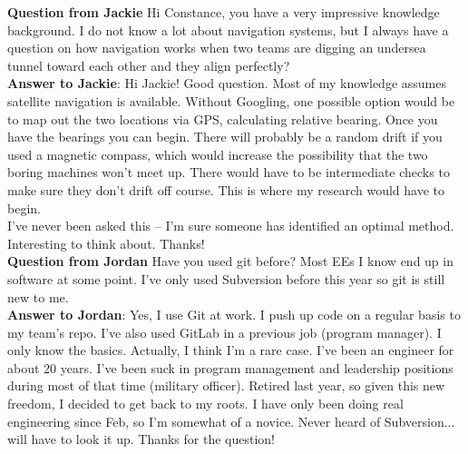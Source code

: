 \textbf{Question from Jackie}
Hi Constance, you have a very impressive knowledge background. I do not know a lot about navigation systems, but I always have a question on how navigation works when two teams are digging an undersea tunnel toward each other and they align perfectly? \\

\textbf{Answer to Jackie}:  Hi Jackie!  Good question.  Most of my knowledge assumes satellite navigation is available.  Without Googling, one possible option would be to map out the two locations via GPS, calculating relative bearing.  Once you have the bearings you can begin.  There will probably be a random drift if you used a magnetic compass, which would increase the possibility that the two boring machines won't meet up.  There would have to be intermediate checks to make sure they don't drift off course.  This is where my research would have to begin.  \\

I've never been asked this  -- I'm sure someone has identified an optimal method.  Interesting to think about.  Thanks!   \\  

\textbf{Question from Jordan}
Have you used git before? Most EEs I know end up in software at some point. I've only used Subversion before this year so git is still new to me.  \\

\textbf{Answer to Jordan}:  Yes, I use Git at work.  I push up code on a regular basis to my team's repo.  I've also used GitLab in a previous job (program manager).  I only know the basics.  Actually, I think I'm a rare case.  I've been an engineer for about 20 years.  I've been suck in program management and leadership positions during most of that time (military officer).  Retired last year, so given this new freedom, I decided to get back to my roots.  I have only been doing real engineering since Feb, so I'm somewhat of a novice.  Never heard of Subversion... will have to look it up.  Thanks for the question!